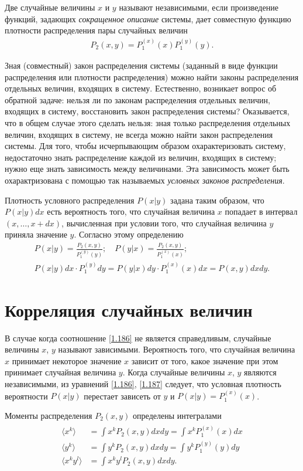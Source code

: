 \documentclass[14pt]{extarticle}
\begin{document}
Две случайные величины $x$ и $y$ называют независимыми, если произведение функций, задающих \textit{сокращенное описание} системы, дает совместную функцию плотности распределения пары случайных величин
\begin{gather}
		P_2(x, y) = P_1^{(x)}(x) P_1^{(y)}(y). \label{1.186}
\end{gather}

Зная (совместный) закон распределения системы (заданный в виде функции распределения или плотности распределения) можно найти законы распределения отдельных величин, входящих в систему. Естественно, возникает вопрос об обратной задаче: нельзя ли по законам распределения отдельных величин, входящих в систему, восстановить закон распределения системы? Оказывается, что в общем случае этого сделать нельзя: зная только распределения отдельных величин, входящих в систему, не всегда можно найти закон распределения системы. Для того, чтобы исчерпывающим образом охарактеризовать систему, недостаточно знать распределение каждой из величин, входящих в систему; нужно еще знать зависимость между величинами. Эта зависимость может быть охарактризована с помощью так называемых \textit{условных законов распределения}.  

Плотность условного распределения $P(x|y)$ задана таким образом, что $P(x|y) dx$ есть вероятность того, что случайная величина $x$ попадает в интервал $(x, \dots, x + dx)$, вычисленная при условии того, что случайная величина $y$ приняла значение $y$. Согласно этому определению
\begin{gather}
	P(x|y) = \frac{P_2(x, y)}{P_1^{(y)}(y)}; \quad P(y|x) = \frac{P_2(x,y)}{P_1^{(x)}(x)}; \label{1.187} \\
	P(x|y) dx \cdot P_1^{(y)}dy = P(y|x) dy \cdot P_1^{(x)}(x) dx = P(x,y)dx dy \label{1.188}.
\end{gather}

\section{Корреляция случайных величин}
В случае когда соотношение \eqref{1.186} не является справедливым, случайные величины $x$, $y$ называют зависимыми. Вероятность того, что случайная величина $x$ принимает некоторое значение $x$ зависит от того, какое значение при этом принимает случайная величина $y$. Когда случайные величины $x$, $y$ являются независимыми, из уравнений \eqref{1.186}, \eqref{1.187} следует, что условная плотность вероятности $P(x|y)$ перестает зависеть от $y$ и $P(x|y) = P_1^{(x)}(x)$. \par
Моменты распределения $P_2(x, y)$ определены интегралами
\begin{gather}
	\begin{aligned}
		\langle x^k \rangle &= \int x^k P_2(x, y) dx dy = \int x^k P_1^{(x)}(x) dx \\
		\langle y^k \rangle &= \int y^k P_2(x, y) dx dy = \int y^k P_1^{(y)}(y) dy \\
		\langle x^k y^l \rangle &= \int x^k y^l P_2(x, y) dx dy.
	\end{aligned}
\end{gather}
\end{document}
